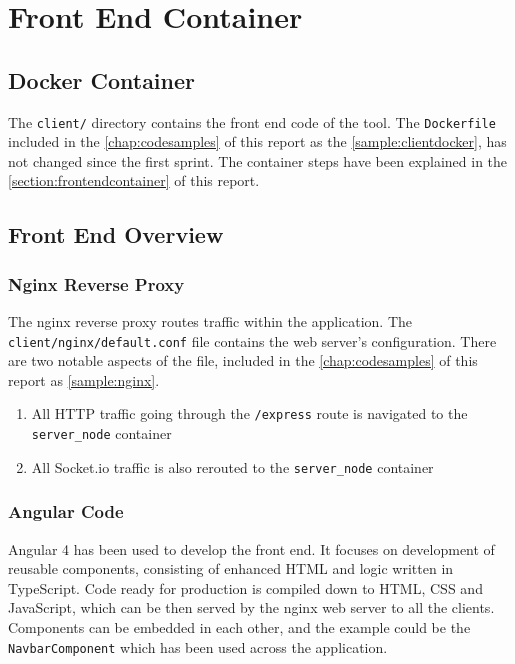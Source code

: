 \section{Front End Container}
\subsection{Docker Container}
The \texttt{client/} directory contains the front end code of the tool. The \texttt{Dockerfile}
included in the \autoref{chap:codesamples} of this report as the \autoref{sample:clientdocker},
has not changed since the first sprint. The container steps have been explained
in the \autoref{section:frontendcontainer} of this report.

\subsection{Front End Overview}
\subsubsection{Nginx Reverse Proxy}
The nginx reverse proxy routes traffic within the application. The \texttt{client/nginx/default.conf}
file contains the web server's configuration. There are two notable aspects of the file, included
in the \autoref{chap:codesamples} of this report as \autoref{sample:nginx}.

\begin{enumerate}
  \item All HTTP traffic going through the \texttt{/express} route is navigated to the \texttt{server\_node}
    container
  \item All Socket.io traffic is also rerouted to the \texttt{server\_node} container
\end{enumerate}

\subsubsection{Angular Code}
Angular 4 has been used to develop the front end. It focuses on development of reusable
components, consisting of enhanced HTML and logic written in TypeScript. Code ready for
production is compiled down to HTML, CSS and JavaScript, which can be then served by
the nginx web server to all the clients. Components can
be embedded in each other, and the example could be the \texttt{NavbarComponent} which has
been used across the application.

